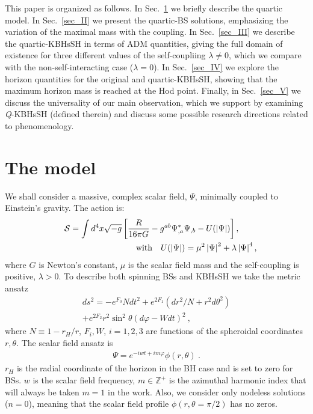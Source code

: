  This paper is organized as follows. In Sec.~\ref{sec_model} we briefly describe the quartic model. In Sec.~\ref{sec_II}  we present the quartic-BS solutions, emphasizing the variation of the maximal mass with the coupling. In Sec.~\ref{sec_III} we describe the quartic-KBHsSH in terms of ADM quantities, giving the full domain of existence for three different values of the self-coupliing $\lambda\neq 0$, which we compare with the non-self-interacting case ($\lambda=0$).  In Sec.~\ref{sec_IV} we explore the horizon quantities for the original and quartic-KBHsSH, showing that the maximum horizon mass is reached at the Hod point. Finally, in Sec.~\ref{sec_V} we discuss the universality of our main observation, which we support by examining \textit{Q}-KBHsSH (defined therein)  and discuss some possible research directions related to phenomenology.
 
 \newpage
 
 
\section{The model}
\label{sec_model}
 
We shall consider a massive, complex scalar field, $\Psi$, minimally coupled to Einstein's gravity. The action is:
%
\begin{eqnarray}
  \label{action}
  &&
	\mathcal{S} = \int d^4x \sqrt{-g}\left[\frac{R}{16\pi G}- g^{ab}\Psi^*_{,a}\Psi_{,b} - U(|\Psi|)\right],~~{~~} \ \  
\\
\label{pot}
&&~~~~{\rm with}~~~U(|\Psi|)= \mu^2\left|\Psi\right|^2 + \lambda\left|\Psi\right|^4,
\end{eqnarray}  
where $G$ is Newton's constant, $\mu$ is the scalar field mass and the self-coupling is positive, $ \lambda>0$. 
%
To describe both spinning BSs and KBHsSH we take the metric ansatz \cite{Herdeiro:2014goa}
%
\begin{eqnarray}
  ds^2 = -e^{F_0}Ndt^2 + e^{2F_1}\left( dr^2/N + r^2d\theta^2 \right) \nonumber \\ + e^{2F_2}r^2\sin^2\theta \left(               d\varphi - Wdt \right)^2 \ ,
\end{eqnarray}
where $N\equiv 1-r_H/r$, $F_i,W$, $i=1,2,3$ are functions of the spheroidal coordinates $r,\theta$. The scalar field ansatz is
\begin{eqnarray}
\label{scalar}
  \Psi = e^{-iwt+im\varphi}\phi(r,\theta) \ .
\end{eqnarray}
$r_H$ is the radial coordinate of the horizon in the BH case and is set to zero for BSs. $w$ is the scalar field frequency, $m\in \mathbb{Z^+}$ is the azimuthal harmonic index that will always be taken $m=1$ in the work. Also, we consider only nodeless solutions ($n=0$), meaning that the scalar field profile $\phi(r,\theta=\pi/2)$ has no zeros.


